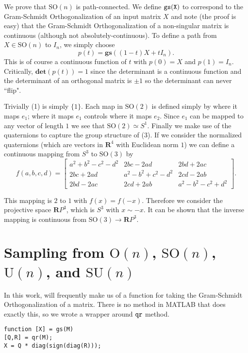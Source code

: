 \documentclass[letterpaper,11pt]{article}
\newcommand{\reals}{\mathbf{R}}
\newcommand{\MG}[2]{{\text{#1}(#2)}}
\newcommand{\Un}{\MG{U}{n}}
\newcommand{\On}{\MG{O}{n}}
\newcommand{\SUn}{\MG{SU}{n}}
\newcommand{\SOn}{\MG{SO}{n}}
\newcommand{\GS}{\mathbf{gs}}
\begin{document}
We prove that $\SOn$ is path-connected. We define $\tt{gs}(X)$ to correspond to the Gram-Schmidt Orthogonalization of an input matrix $X$ and note (the proof is easy) that the Gram-Schmidt Orthogonalization of a non-singular matrix is continuous (although not absolutely-continuous). To define a path from $X \in \SOn$ to $I_n$, we simply choose
\begin{equation}
  p(t) = \GS( (1-t) X + t I_n).
\end{equation}
This is of course a continuous function of $t$ with $p(0) = X$ and $p(1) = I_n$. Critically, $\textbf{det} (p(t))=1$ since the determinant is a continuous function and the determinant of an orthogonal matrix is $\pm 1$ so the determinant can never ``flip".

Trivially \MG{SO}{1} is simply $\{1\}$. Each map in $\MG{SO}{2}$ is defined simply by where it maps $e_1$; where it maps $e_1$ controls where it maps $e_2$. Since $e_1$ can be mapped to any vector of length $1$ we see that $\MG{SO}{2} \simeq S^1$. Finally we make use of the quaternions to capture the group structure of \MG{SO}{3}. If we consider the normalized quaternions (which are vectors in $\reals^4$ with Euclidean norm $1$) we can define a continuous mapping from $S^3$ to $\MG{SO}{3}$ by 
\[
  f(a,b,c,d) = \begin{bmatrix} a^2 + b^2 - c^2 - d^2   & 2bc - 2ad & 2bd + 2ac \\ 2bc+2ad & a^2 - b^2 + c^2- d^2 & 2cd - 2ab \\ 2bd-2ac & 2cd +2ab & a^2-b^2-c^2+d^2 \end{bmatrix}.
\]

This mapping is $2$ to $1$ with $f(x) = f(-x)$. Therefore we consider the projective space $\reals P^3$, which is $S^3$ with $x \sim -x$. It can be shown that the inverse mapping is continuous from $ \MG{SO}{3} \rightarrow \reals P^3$.




\section{Sampling from $\On$, $\SOn$, $\Un$, and $\SUn$}

In this work, will frequently make us of a function for taking the Gram-Schmidt Orthogonalization of a matrix. 
	There is no method in MATLAB that does exactly this, so we wrote a wrapper around $\tt{qr}$ method. 

\begin{lstlisting}[label=gramSchimdt,caption=Computing the Gram-Schmidt Orthogonalization of a input matrix.]
function [X] = gs(M)
[Q,R] = qr(M);
X = Q * diag(sign(diag(R)));
\end{lstlisting}
\end{document}
